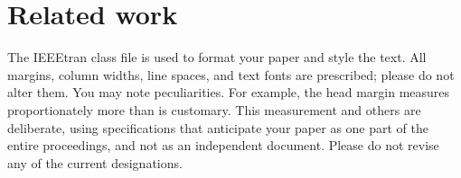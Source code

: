 
\section{Related work} \label{sec:related_work}

The IEEEtran class file is used to format your paper and style the text. All margins, column widths, line spaces, and text fonts are prescribed; please do not  alter them. You may note peculiarities. For example, the head margin
measures proportionately more than is customary. This measurement 
and others are deliberate, using specifications that anticipate your paper 
as one part of the entire proceedings, and not as an independent document. 
Please do not revise any of the current designations.
